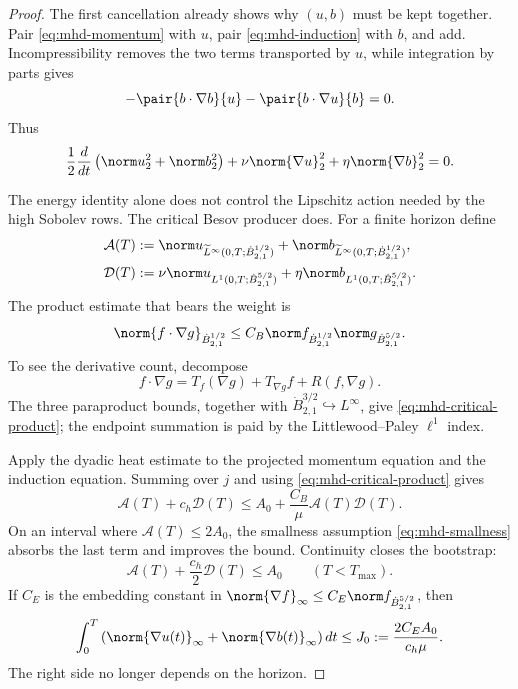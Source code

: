 \begin{proof}
The first cancellation already shows why \((u,b)\) must be kept together.
Pair \eqref{eq:mhd-momentum} with \(u\), pair
\eqref{eq:mhd-induction} with \(b\), and add.  Incompressibility removes
the two terms transported by \(u\), while integration by parts gives
\[
 -\pair{b\cdot\nabla b}{u}
 -\pair{b\cdot\nabla u}{b}=0.
\]
Thus
\begin{equation}
 \frac12\frac d{dt}
 \left(\norm u_2^2+\norm b_2^2\right)
 +\nu\norm{\nabla u}_2^2+\eta\norm{\nabla b}_2^2=0.
 \label{eq:mhd-energy}
\end{equation}

The energy identity alone does not control the Lipschitz action needed by
the high Sobolev rows.  The critical Besov producer does.  For a finite
horizon define
\begin{align}
 \mathcal A(T)
 &:=\norm u_{\widetilde L^\infty(0,T;\dot B^{1/2}_{2,1})}
   +\norm b_{\widetilde L^\infty(0,T;\dot B^{1/2}_{2,1})},
 \label{eq:mhd-critical-size}\\
 \mathcal D(T)
 &:=\nu\norm u_{L^1(0,T;\dot B^{5/2}_{2,1})}
   +\eta\norm b_{L^1(0,T;\dot B^{5/2}_{2,1})}.
 \label{eq:mhd-critical-dissipation}
\end{align}
The product estimate that bears the weight is
\begin{equation}
 \norm{f\cdot\nabla g}_{\dot B^{1/2}_{2,1}}
 \le C_B\norm f_{\dot B^{1/2}_{2,1}}
          \norm g_{\dot B^{5/2}_{2,1}}.
 \label{eq:mhd-critical-product}
\end{equation}
To see the derivative count, decompose
\[
 f\cdot\nabla g
 =T_f(\nabla g)+T_{\nabla g}f+R(f,\nabla g).
\]
The three paraproduct bounds, together with
\(\dot B^{3/2}_{2,1}\hookrightarrow L^\infty\), give
\eqref{eq:mhd-critical-product}; the endpoint summation is paid by the
Littlewood--Paley \(\ell^1\) index.

Apply the dyadic heat estimate to the projected momentum equation and the
induction equation.  Summing over \(j\) and using
\eqref{eq:mhd-critical-product} gives
\begin{equation}
 \mathcal A(T)+c_h\mathcal D(T)
 \le A_0+\frac{C_B}{\mu}\mathcal A(T)\mathcal D(T).
 \label{eq:mhd-bootstrap-inequality}
\end{equation}
On an interval where \(\mathcal A(T)\le2A_0\), the smallness assumption
\eqref{eq:mhd-smallness} absorbs the last term and improves the bound.
Continuity closes the bootstrap:
\begin{equation}
 \mathcal A(T)+\frac{c_h}{2}\mathcal D(T)
 \le A_0
 \qquad(T<T_{\max}).
 \label{eq:mhd-critical-producer}
\end{equation}
If \(C_E\) is the embedding constant in
\(\norm{\nabla f}_\infty\le C_E\norm f_{\dot B^{5/2}_{2,1}}\), then
\begin{equation}
 \int_0^T\left(\norm{\nabla u(t)}_\infty
                  +\norm{\nabla b(t)}_\infty\right)dt
 \le J_0:=\frac{2C_EA_0}{c_h\mu}.
 \label{eq:mhd-lipschitz-action}
\end{equation}
The right side no longer depends on the horizon.


\end{proof}
